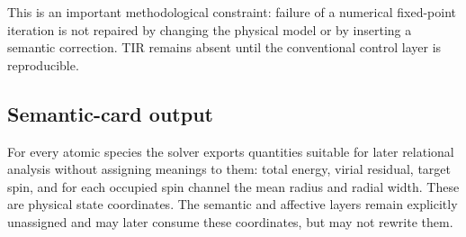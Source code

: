 This is an important methodological constraint: failure of a numerical fixed-point iteration is not repaired by changing the physical model or by inserting a semantic correction.  TIR remains absent until the conventional control layer is reproducible.

\subsection{Semantic-card output}
For every atomic species the solver exports quantities suitable for later relational analysis without assigning meanings to them: total energy, virial residual, target spin, and for each occupied spin channel the mean radius and radial width.  These are physical state coordinates.  The semantic and affective layers remain explicitly unassigned and may later consume these coordinates, but may not rewrite them.
